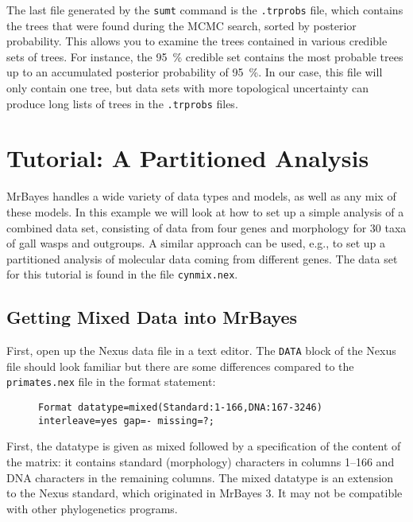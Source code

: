 \documentclass[12pt]{book}
\begin{document}
The last file generated by the \texttt{sumt} command is the \texttt{.trprobs} file, which contains
the trees that were found during the MCMC search, sorted by posterior probability. This allows you
to examine the trees contained in various credible sets of trees. For instance, the 95~\% credible
set contains the most probable trees up to an accumulated posterior probability of 95~\%. In our
case, this file will only contain one tree, but data sets with more topological uncertainty can
produce long lists of trees in the \texttt{.trprobs} files.

\chapter{Tutorial: A Partitioned Analysis}\label{tutorialPartitioned}

MrBayes handles a wide variety of data types and models, as well as any mix of these models. In
this example we will look at how to set up a simple analysis of a combined data set, consisting of
data from four genes and morphology for 30 taxa of gall wasps and outgroups. A similar approach can
be used, e.g., to set up a partitioned analysis of molecular data coming from different genes. The
data set for this tutorial is found in the file \texttt{cynmix.nex}. 

\section{Getting Mixed Data into MrBayes}

First, open up the Nexus data file in a text editor. The \texttt{DATA} block of the Nexus file
should look familiar but there are some differences compared to the \texttt{primates.nex} file in
the format statement:

\begin{figure}[h]
\begin{BVerbatim}
Format datatype=mixed(Standard:1-166,DNA:167-3246) interleave=yes gap=- missing=?;
\end{BVerbatim}
\end{figure}

First, the datatype is given as mixed followed by a specification of the content of the matrix: it
contains standard (morphology) characters in columns 1--166 and DNA characters in the remaining
columns. The mixed datatype is an extension to the Nexus standard, which originated in MrBayes 3.
It may not be compatible with other phylogenetics programs.
\end{document}
